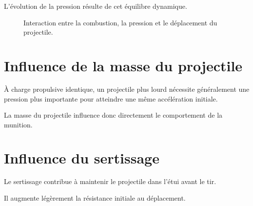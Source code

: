 L'évolution de la pression résulte de cet équilibre dynamique.

\begin{figure}[htbp]
\centering


\caption{Interaction entre la combustion, la pression et le déplacement du projectile.}
\label{fig:couplage_pression}

\end{figure}

\section{Influence de la masse du projectile}

À charge propulsive identique, un projectile plus lourd nécessite généralement
une pression plus importante pour atteindre une même accélération initiale.

La masse du projectile influence donc directement le comportement de la
munition.

\section{Influence du sertissage}

Le sertissage contribue à maintenir le projectile dans l'étui avant le tir.

Il augmente légèrement la résistance initiale au déplacement.


